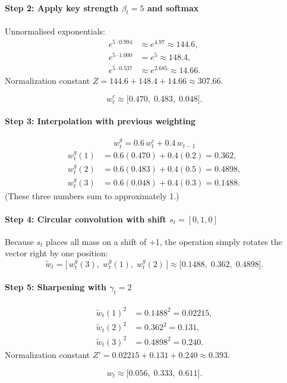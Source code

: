\documentclass[12pt, a4paper]{article}
\begin{document}
{\paragraph{Step 2: Apply key strength \(\beta_t=5\) and softmax}
Unnormalised exponentials:
\[
\begin{aligned}
e^{5\cdot0.994}&\approx e^{4.97}\approx144.6,\\
e^{5\cdot1.000}&=e^{5}\approx148.4,\\
e^{5\cdot0.537}&\approx e^{2.685}\approx14.66.
\end{aligned}
\]
Normalization constant \(Z=144.6+148.4+14.66\approx307.66\).

\[
w_t^{c}\approx\bigl[0.470,\;0.483,\;0.048\bigr].
\]

\paragraph{Step 3: Interpolation with previous weighting}
\[
w_t^{g}=0.6\,w_t^{c}+0.4\,w_{t-1}
\]
\[
\begin{aligned}
w_t^{g}(1)&=0.6(0.470)+0.4(0.2)=0.362,\\
w_t^{g}(2)&=0.6(0.483)+0.4(0.5)=0.4898,\\
w_t^{g}(3)&=0.6(0.048)+0.4(0.3)=0.1488.
\end{aligned}
\]
(These three numbers sum to approximately 1.)

\paragraph{Step 4: Circular convolution with shift \(s_t=[0,1,0]\)}
Because \(s_t\) places all mass on a shift of +1, the operation simply rotates the vector right by one position:
\[
\tilde{w}_t=\bigl[\,w_t^{g}(3),\;w_t^{g}(1),\;w_t^{g}(2)\,\bigr]
          \approx\bigl[0.1488,\;0.362,\;0.4898\bigr].
\]

\paragraph{Step 5: Sharpening with \(\gamma_t=2\)}
\[
\begin{aligned}
\tilde{w}_t(1)^{2}&=0.1488^{2}=0.02215,\\
\tilde{w}_t(2)^{2}&=0.362^{2}=0.131,\\
\tilde{w}_t(3)^{2}&=0.4898^{2}=0.240.
\end{aligned}
\]
Normalization constant \(Z'=0.02215+0.131+0.240\approx0.393\).

\[
w_t\approx\bigl[0.056,\;0.333,\;0.611\bigr].
\]

}
\end{document}
